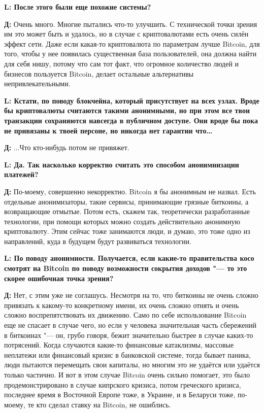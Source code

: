 \documentclass[10pt, a5paper]{article}
\begin{document}
{\noindent \bf L: После этого были еще похожие системы?}

{\noindent \bf Д:} Очень много. Многие пытались что-то улучшить. С технической точки зрения им это может быть и удалось, но в случае с криптовалютами есть очень силён эффект сети. Даже если какая-то криптовалюта по параметрам  лучше Bitcoin, для того, чтобы у нее появилась существенная база пользователей, она должна найти для себя нишу, потому что сам тот факт, что огромное количество людей и бизнесов пользуется Bitcoin, делает остальные альтернативы непривлекательными.
 
{\noindent \bf L: Кстати, по поводу блокчейна, который присутствует на всех узлах. Вроде бы криптовалюты считаются такими анонимными, но при этом все твои транзакции сохраняются навсегда в публичном доступе. Они вроде бы пока не привязаны к твоей персоне, но никогда нет гарантии что\ldots}

{\noindent \bf Д:} ...Что кто-нибудь потом не привяжет.


{\noindent \bf L: Да. Так насколько корректно считать это способом анонимнизации платежей?}

{\noindent \bf Д:} По-моему, совершенно некорректно. Bitcoin я бы анонимным не назвал. Есть отдельные анонимизаторы, такие сервисы, принимающие грязные биткоины, а возвращающие отмытые. Потом есть, скажем так, теоретически разработанные технологии, при помощи которых можно создать действительно анонимную криптовалюту. Этим сейчас тоже занимаются люди, и думаю, это тоже одно из направлений, куда в будущем будут развиваться технологии.

{\noindent \bf L: По поводу анонимности. Получается, если какие-то правительства косо смотрят на Bitcoin по поводу возможности сокрытия доходов "--- то это скорее ошибочная точка зрения?}

{\noindent \bf Д:} Нет, с этим уже не соглашусь. Несмотря на то, что биткоины не очень сложно привязать к какому-то конкретному имени, их очень сложно отнять и очень сложно воспрепятствовать их движению. Само по себе использование Bitcoin еще не спасает в случае чего, но если у человека значительная часть сбережений в биткоинах "--- он, грубо говоря, бежит значительно быстрее в случае каких-то потрясений. Когда случаются какие-то финансовые катаклизмы, массовые неплатежи или финансовый кризис в банковской системе, тогда бывает паника, люди пытаются перемещать свои капиталы, но многим это не удаётся или удаётся только частично. И вот в этом случае Bitcoin очень сильно помогает, это было продемонстрировано в случае кипрского кризиса, потом греческого кризиса, последнее время в Восточной Европе тоже, в Украине, и в Беларуси тоже, по-моему, те кто сделал ставку на Bitcoin, не ошиблись. 
\end{document}
